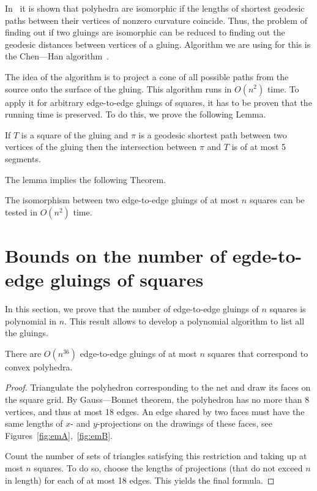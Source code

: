 \documentclass[a4paper,USenglish,cleveref, autoref, thm-restate]{socg-lipics-v2019}
\begin{document}
In~\cite{DO07} it is shown that polyhedra are isomorphic if the lengths of shortest geodesic paths between their vertices of nonzero curvature coincide. Thus, the problem of finding out if two gluings are isomorphic can be reduced to finding out the geodesic distances between vertices of a gluing. Algorithm we are using for this is the Chen—Han algorithm~\cite{chen-han}.

The idea of the algorithm is to project a cone of all possible paths from the source onto the surface of the gluing. This algorithm runs in $O(n^2)$ time. To apply it for arbitrary edge-to-edge gluings of squares, it has to be proven that the running time is preserved. To do this, we prove the following Lemma.

\begin{lemma} \label{lm:shortestSquare}
	If $T$ is a square of the gluing and $\pi$ is a geodesic shortest path between two vertices of the gluing then the intersection between $\pi$ and $T$ is of at most 5 segments.
\end{lemma}

The lemma implies the following Theorem.

\begin{theorem} \label{thm:chruntime}
	The isomorphism between two edge-to-edge gluings of at most $n$ squares can be tested in $O(n^2)$ time.
\end{theorem}

\section{Bounds on the number of egde-to-edge gluings of squares}

In this section, we prove that the number of edge-to-edge gluings of $n$ squares is polynomial in $n$. This result allows to develop a polynomial algorithm to list all the gluings.

\begin{theorem} \label{thm:n36}
	There are $O \left( n^{36} \right)$ edge-to-edge gluings of at most $n$ squares that correspond to convex polyhedra.
\end{theorem}

\begin{proof}
	Triangulate the polyhedron corresponding to the net and draw its faces on the square grid. By Gauss—Bonnet theorem, the polyhedron has no more than 8 vertices, and thus at most 18 edges. An edge shared by two faces must have the same lengths of $x$- and $y$-projections on the drawings of these faces, see Figures~\ref{fig:emA},~\ref{fig:emB}.

	Count the number of sets of triangles satisfying this restriction and taking up at most $n$ squares. To do so, choose the lengths of projections (that do not exceed $n$ in length) for each of at most 18 edges. This yields the final formula.
\end{proof}
\end{document}

